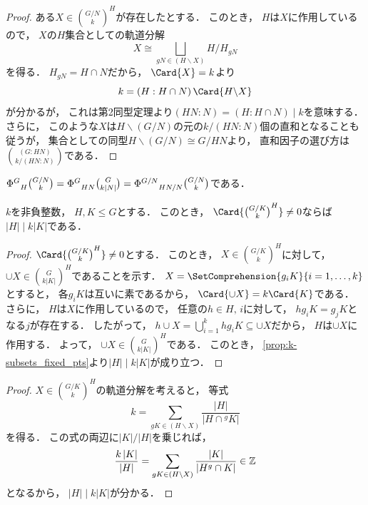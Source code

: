 \documentclass{jlreq}
\newcommand{\FixedPts}[2]{{#1}^{#2}}
\newcommand{\Index}[2]{\left(#2 : #1\right)}
\newcommand{\CompReps}[1]{\left(#1\right)}
\newcommand{\Conj}[1]{{}^{#1}\!}
\newcommand{\Stab}[2]{{#2}_{#1}}
\newcommand{\Order}[1]{\left| #1 \right|}
\begin{document}
	\begin{proof}
		ある$X \in \FixedPts{\binom{G/N}{k}}{H}$が存在したとする．
		このとき，
		$H$は$X$に作用しているので，
		$X$の$H$集合としての軌道分解
		\begin{equation}\label{eq:orbit_decomp_subset}
			X \cong \bigsqcup_{gN \in \CompReps{H \backslash X}} H/\Stab{gN}{H}
		\end{equation}
		を得る．
		$\Stab{gN}{H} = H \cap N$だから，
		$\Card{X} = k$より
		\begin{equation}
			k = \Index{H \cap N}{H} \Card{H \backslash X}
		\end{equation}
		が分かるが，
		これは第2同型定理より$\Index{N}{HN} = \Index{H \cap N}{H} \mid k$を意味する．
		さらに，
		このような$X$は$H \backslash (G/N)$の元の$k/\Index{N}{HN}$個の直和となることも従うが，
		集合としての同型$H \backslash (G/N) \cong G/HN$より，
		直和因子の選び方は$\binom{\Index{HN}{G}}{k/\Index{N}{HN}}$である．
	\end{proof}
	
	\begin{corollary}
		${\FixedPtMap^G}_H \binom{G/N}{k} = {\FixedPtMap^G}_{HN} \binom{G}{k \Order{N}} = {\FixedPtMap^{G/N}}_{HN/N} \binom{G/N}{k}$である．
	\end{corollary}
	
	\begin{proposition}
		$k$を非負整数，
		$H, K \le G$とする．
		このとき，
		$\Card{\FixedPts{\binom{G/K}{k}}{H}} \ne 0$ならば$\Order{H} \mid k \Order{K}$である．
	\end{proposition}
	
	\begin{proof}
		$\Card{\FixedPts{\binom{G/K}{k}}{H}} \ne 0$とする．
		このとき，
		$X \in \FixedPts{\binom{G/K}{k}}{H}$に対して，
		${\cup}X \in \FixedPts{\binom{G}{k \Order{K}}}{H}$であることを示す．
		$X = \SetComprehension{g_i K}{i = 1, \dotsc, k}$とすると，
		各$g_i K$は互いに素であるから，
		$\Card{{\cup}X} = k \Card{K}$である．
		さらに，
		$H$は$X$に作用しているので，
		任意の$h \in H,\, i$に対して，
		$h g_i K = g_j K$となる$j$が存在する．
		したがって，
		$h {\cup}X = \bigcup_{i=1}^k h g_i K \subseteq {\cup}X$だから，
		$H$は${\cup}X$に作用する．
		よって，
		${\cup}X \in \FixedPts{\binom{G}{k \Order{K}}}{H}$である．
		このとき，
		\cref{prop:k-subsets_fixed_pts}より$\Order{H} \mid k \Order{K}$が成り立つ．
	\end{proof}
	
	\begin{proof}
		$X \in \FixedPts{\binom{G/K}{k}}{H}$の軌道分解を考えると，
		等式
		\begin{equation}\label{eq:orbit_decomp_subset_cosets}
			k = \sum_{gK \in \CompReps{H \backslash X}} \frac{\Order{H}}{\Order{H \cap \Conj{g}K}}
		\end{equation}
		を得る．
		この式の両辺に$\Order{K}/\Order{H}$を乗じれば，
		\begin{equation}
			\frac{k \Order{K}}{\Order{H}} = \sum_{gK \in \CompReps{H \backslash X}} \frac{\Order{K}}{\Order{H^g \cap K}} \in \Z
		\end{equation}
		となるから，
		$\Order{H} \mid k \Order{K}$が分かる．
	\end{proof}
	
\end{document}
